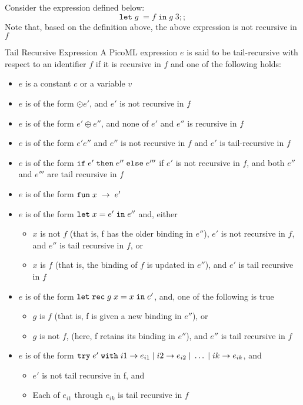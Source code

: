 \begin{example}
Consider the expression defined below:
\[
\mathtt{let} \; {g} \; = f \; \mathtt{in} \; g \; 3;; 
\]
Note that, based on the definition above, the above expression is not recursive in $f$
 \end{example} 

\begin{definition}{Tail Recursive Expression}
A PicoML expression $e$ is said to be tail-recursive with respect to an identifier $f$ if it is recursive in $f$ and one of the following holds:
\begin{itemize}
\item $e$ is a constant $c$ or a variable $v$
\item $e$ is of the form $\odot e'$, and $e'$ is not recursive in $f$
\item $e$ is of the form $e' \oplus e''$, and none of $e'$ and $e''$ is recursive in $f$
\item $e$ is of the form $e' e''$ and $e''$ is not recursive in $f$ and $e'$ is tail-recursive in $f$
\item $e$ is of the form $\ifexp{e'}{e''}{e'''}$ if $e'$ is not recursive in $f$, and both $e''$ and $e'''$ are tail recursive in $f$
\item $e$ is of the form $\funexp{x}{e'}$
\item $e$ is of the form $\letinexp{x}{e'}{e''}$ and, either
  \begin{itemize}
   \item $x$ is not $f$ (that is, f has the older binding in $e''$), $e'$ is not recursive in $f$, and $e''$ is tail recursive in $f$, or
   \item $x$ is $f$ (that is, the binding of $f$ is updated in $e''$), and $e'$ is tail recursive in $f$
  \end{itemize}
\item $e$ is of the form $\letrecinexp{g}{x}{e'}{e''}$, and, one of the following is true
  \begin{itemize}
   \item $g$ is $f$ (that is, f is given a new binding in $e''$), or
   \item $g$ is not $f$, (here, f retains its binding in $e''$), and $e''$ is tail recursive in $f$
  \end{itemize}
\item $e$ is of the form $\mathtt{try} \; e' \; \mathtt{with} \; i1 \arr e_{i1} \; | \; i2 \arr e_{i2} \; | \; \ldots \; | \; ik \arr e_{ik}$, and
  \begin{itemize}
   \item $e'$ is not tail recursive in f, and
   \item Each of $e_{i1}$ through $e_{ik}$ is tail recursive in $f$
  \end{itemize}
\end{itemize}
\end{definition}


